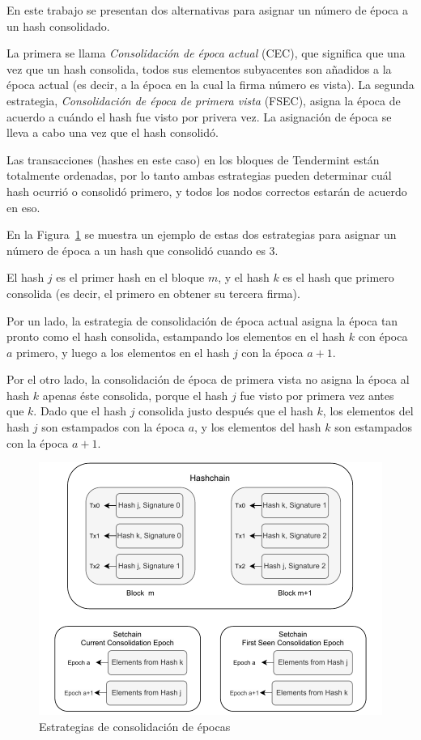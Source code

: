 %

En este trabajo se presentan dos alternativas para asignar un número de época a un hash consolidado.

%
La primera se llama \textit{Consolidación de época actual} (CEC), que significa que 
una vez que un hash consolida, todos sus elementos subyacentes son añadidos a la época actual
(es decir, a la época en la cual la firma número \SPH es vista).
%
La segunda estrategia, \textit{Consolidación de época de primera vista} (FSEC), asigna la época
de acuerdo a cuándo el hash fue visto por privera vez. La asignación de época se lleva
a cabo una vez que el hash consolidó. 

%
Las transacciones (hashes en este caso) en los bloques de Tendermint están totalmente ordenadas,
por lo tanto ambas estrategias pueden determinar cuál hash ocurrió o consolidó primero, y
todos los nodos correctos estarán de acuerdo en eso.

%

En la Figura~\ref{fig:consolidation_epoch} se muestra un ejemplo de estas dos estrategias para asignar
un número de época a un hash que consolidó cuando \SPH es 3.

%
El hash $j$ es el primer hash en el bloque $m$, y el hash $k$ es el hash que primero consolida
(es decir, el primero en obtener su tercera firma).

%
Por un lado, la estrategia de consolidación de época actual asigna la época tan pronto como
el hash consolida, estampando los elementos en el hash $k$ con época $a$ primero, y luego
a los elementos en el hash $j$ con la época $a+1$.

%
Por el otro lado, la consolidación de época de primera vista no asigna la época al hash $k$
apenas éste consolida, porque el hash $j$ fue visto por primera vez antes que $k$.
%
Dado que el hash $j$ consolida justo después que el hash $k$, los elementos del hash $j$ son
estampados
con la época $a$, y los elementos del hash $k$ son estampados con la época $a+1$. 


\begin{figure}
  \centering
  \includegraphics[scale=0.7]{figures/consolidation_epoch.pdf}
  \caption{Estrategias de consolidación de épocas}
  \label{fig:consolidation_epoch}
\end{figure}

